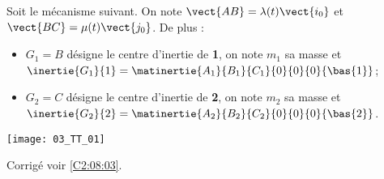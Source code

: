 \normaltrue
\correctionfalse



\setcounter{question}{0}
\ifcorrection
\else
{}
\fi

\ifprof
\else
Soit le mécanisme suivant. On note $\vect{AB}=\lambda(t)\vect{i_0}$ et $\vect{BC}=\mu(t)\vect{j_0}$. De plus :
\begin{itemize}
\item $G_1 = B$ désigne le centre d'inertie de \textbf{1}, on note $m_1$ sa masse et $\inertie{G_1}{1}=\matinertie{A_1}{B_1}{C_1}{0}{0}{0}{\bas{1}}$; 
\item $G_2 = C$ désigne le centre d'inertie de \textbf{2}, on note $m_2$ sa masse et $\inertie{G_2}{2}=\matinertie{A_2}{B_2}{C_2}{0}{0}{0}{\bas{2}}$.
\end{itemize}
\begin{center}
\texttt{[image: 03\_TT\_01]}
\end{center}
\fi

\ifprof
\else
\fi

\ifprof
\else
\fi

\ifprof
\else
\fi

\ifprof
\else
\begin{flushright}
\footnotesize{Corrigé  voir \ref{C2:08:03}.}
\end{flushright}%
\fi